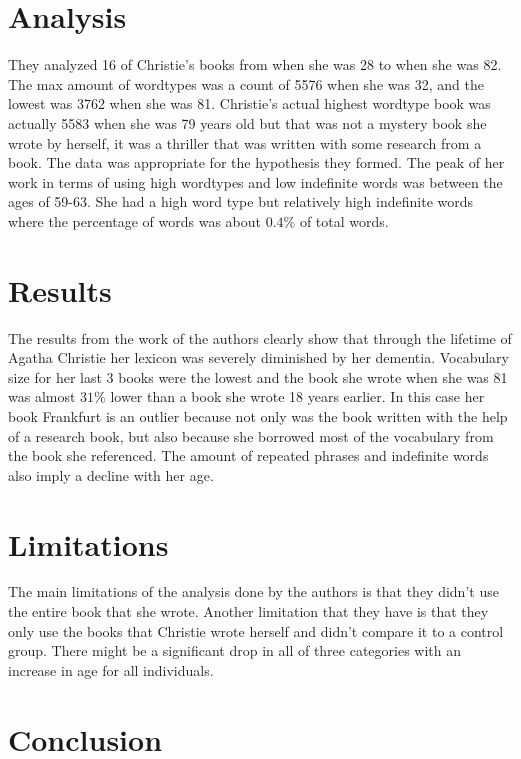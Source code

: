 \documentclass[journal, a4paper]{IEEEtran}
\begin{document}
\section{Analysis}
They analyzed 16 of Christie's books from when she was 28 to when she was 82. The max amount of wordtypes was a count of 5576 when she was 32, and the lowest was 3762 when she was 81. Christie's actual highest wordtype book was actually 5583 when she was 79 years old but that was not a mystery book she wrote by herself, it was a thriller that was written with some research from a book. The data was appropriate for the hypothesis they formed. The peak of her work in terms of using high wordtypes and low indefinite words was between the ages of 59-63. She had a high word type but relatively high indefinite words where the percentage of words was about $0.4\%$ of total words.

\section{Results}
The results from the work of the authors clearly show that through the lifetime of Agatha Christie her lexicon was severely diminished by her dementia. Vocabulary size for her last 3 books were the lowest and the book she wrote when she was 81 was almost $31\%$ lower than a book she wrote 18 years earlier. In this case her book Frankfurt is an outlier because not only was the book written with the help of a research book, but also because she borrowed most of the vocabulary from the book she referenced. The amount of repeated phrases and indefinite words also imply a decline with her age. 

\section{Limitations}

The main limitations of the analysis done by the authors is that they didn't use the entire book that she wrote. Another limitation that they have is that they only use the books that Christie wrote herself and didn't compare it to a control group. There might be a significant drop in all of three categories with an increase in age for all individuals.

\section{Conclusion}
\end{document}

